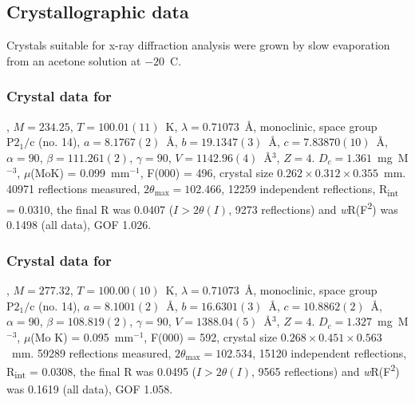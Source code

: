 \begin{refsection}
\subsection{Crystallographic data}
Crystals suitable for x-ray diffraction analysis were grown by slow evaporation from an acetone solution at $-20$~\degree{}C.

\subsubsection{Crystal data for \texorpdfstring{}{C12 H14 N2 O3}}
, $M=234.25$, $T=100.01(11)$~K, $\lambda=0.71073$~\AA, monoclinic, space group $\text{P}2_1/\text{c}$ (no. 14), $a = 8.1767(2)$~\AA, $b = 19.1347(3)$~\AA, $c = 7.83870(10)$~\AA, $\alpha = 90$\degree, $\beta = 111.261(2)$\degree, $\gamma = 90$\degree, $V = 1142.96(4)$~\AA$^{3}$, $Z = 4$. $D_{c}= 1.361$~mg~M$^{-3}$, $\mu$(MoK\a) = 0.099~mm$^{-1}$, F(000) = 496, crystal size $0.262 \times 0.312 \times 0.355$~mm. 40971 reflections measured, $2\theta_{\max}=102.466$\degree, 12259 independent reflections, R\textsubscript{int} = 0.0310, the final R was 0.0407 ($I > 2\theta(I)$, 9273 reflections) and \emph{w}R(F\textsuperscript{2}) was 0.1498 (all data), GOF 1.026. 

\subsubsection{Crystal data for \texorpdfstring{}{C14 H19 N3 O3}}
, $M=277.32$, $T=100.00(10)$~K, $\lambda=0.71073$~\AA, monoclinic, space group $\text{P}2_1/\text{c}$ (no. 14), $a = 8.1001(2)$~\AA, $b = 16.6301(3)$~\AA, $c = 10.8862(2)$~\AA, $\alpha = 90$\degree, $\beta = 108.819(2)$\degree, $\gamma = 90$\degree, $V = 1388.04(5)$~\AA$^{3}$, $Z = 4$. $D_{c}= 1.327$~mg~M$^{-3}$, $\mu$(Mo K\a) = 0.095~mm$^{-1}$, F(000) = 592, crystal size $0.268 \times 0.451 \times 0.563$~mm. 59289 reflections measured, $2\theta_{\max}=102.534$\degree, 15120 independent reflections, R\textsubscript{int} = 0.0308, the final R was 0.0495 ($I > 2\theta(I)$, 9565 reflections) and \emph{w}R(F\textsuperscript{2}) was 0.1619 (all data), GOF 1.058. 


\end{refsection}
